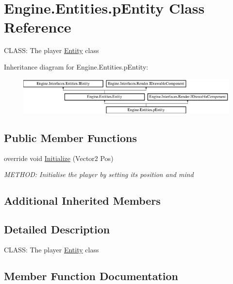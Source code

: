 \hypertarget{a00322}{}\section{Engine.\+Entities.\+p\+Entity Class Reference}
\label{a00322}


C\+L\+A\+SS\+: The player \hyperlink{a00314}{Entity} class  


Inheritance diagram for Engine.\+Entities.\+p\+Entity\+:\begin{figure}[H]
\begin{center}
\leavevmode
\includegraphics[height=1.944444cm]{de/de9/a00322}
\end{center}
\end{figure}
\subsection*{Public Member Functions}
\begin{DoxyCompactItemize}
\item 
override void \hyperlink{a00322_aad953baa984c0f958d3e96efbfc3bca9}{Initialize} (Vector2 Pos)
\begin{DoxyCompactList}\small\item\em M\+E\+T\+H\+OD\+: Initialise the player by setting it\textquotesingle{}s position and mind \end{DoxyCompactList}\end{DoxyCompactItemize}
\subsection*{Additional Inherited Members}


\subsection{Detailed Description}
C\+L\+A\+SS\+: The player \hyperlink{a00314}{Entity} class 



\subsection{Member Function Documentation}
\mbox{\label{a00322_aad953baa984c0f958d3e96efbfc3bca9}} 
